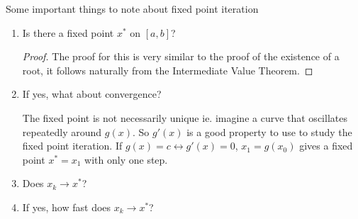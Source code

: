 \documentclass[12pt]{scrartcl}
\begin{document}
\begin{note}
  Some important things to note about fixed point iteration

  \begin{enumerate}
    \item Is there a fixed point $x^*$ on $[a,b]$?
    
    \begin{proof}
      The proof for this is very similar to the proof of the existence of a root, it follows 
      naturally from the Intermediate Value Theorem. 
    \end{proof}
    \item If yes, what about convergence?
    
    The fixed point is not necessarily unique ie. imagine a curve that oscillates repeatedly around $g(x)$. 
    So $g'(x)$ is a good property to use to study the fixed point iteration. If $g(x) = c \longleftrightarrow g'(x) = 0$, 
    $x_1 = g(x_0)$ gives a fixed point $x^* = x_1$ with only one step.
    
    \item Does $x_k \to x^*$?
    \item If yes, how fast does $x_k \to x^*$?
  \end{enumerate}
\end{note}
\end{document}
